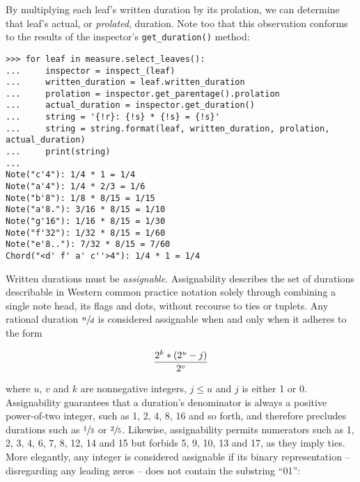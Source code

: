 \noindent By multiplying each leaf's written duration by its prolation, we can
determine that leaf's actual, or \emph{prolated}, duration. Note too that this
observation conforms to the results of the inspector's \texttt{get\_duration()}
method:

\begin{comment}
<abjad>
for leaf in measure.select_leaves():
    inspector = inspect_(leaf)
    written_duration = leaf.written_duration
    prolation = inspector.get_parentage().prolation
    actual_duration = inspector.get_duration()
    string = '{!r}: {!s} * {!s} = {!s}'
    string = string.format(leaf, written_duration, prolation, actual_duration)
    print(string)

</abjad>
\end{comment}

\begin{abjadbookoutput}
\begin{singlespacing}
\vspace{-0.5\baselineskip}
\begin{verbatim}
>>> for leaf in measure.select_leaves():
...     inspector = inspect_(leaf)
...     written_duration = leaf.written_duration
...     prolation = inspector.get_parentage().prolation
...     actual_duration = inspector.get_duration()
...     string = '{!r}: {!s} * {!s} = {!s}'
...     string = string.format(leaf, written_duration, prolation, actual_duration)
...     print(string)
...
Note("c'4"): 1/4 * 1 = 1/4
Note("a'4"): 1/4 * 2/3 = 1/6
Note("b'8"): 1/8 * 8/15 = 1/15
Note("a'8."): 3/16 * 8/15 = 1/10
Note("g'16"): 1/16 * 8/15 = 1/30
Note("f'32"): 1/32 * 8/15 = 1/60
Note("e'8.."): 7/32 * 8/15 = 7/60
Chord("<d' f' a' c''>4"): 1/4 * 1 = 1/4
\end{verbatim}
\end{singlespacing}
\end{abjadbookoutput}

\noindent Written durations must be \emph{assignable}. Assignability describes
the set of durations describable in Western common practice notation solely
through combining a single note head, its flags and dots, without recourse to
ties or tuplets. Any rational duration $\sfrac[big]{n}{d}$ is considered assignable
when and only when it adheres to the form

\begin{equation}
{ 2^k * (2^u - j) \over 2^v }
\end{equation}

\noindent where $u$, $v$ and $k$ are nonnegative integers, $j \leq u$ and $j$
is either 1 or 0. Assignability guarantees that a duration's denominator is
always a positive power-of-two integer, such as 1, 2, 4, 8, 16 and so forth,
and therefore precludes durations such as $\sfrac[big]{1}{3}$ or $\sfrac[big]{2}{5}$.
Likewise, assignability permits numerators such as 1, 2, 3, 4, 6, 7, 8, 12, 14
and 15 but forbids 5, 9, 10, 13 and 17, as they imply ties. More elegantly, any
integer is considered assignable if its binary representation -- disregarding
any leading zeros -- does not contain the substring \enquote{01}:

